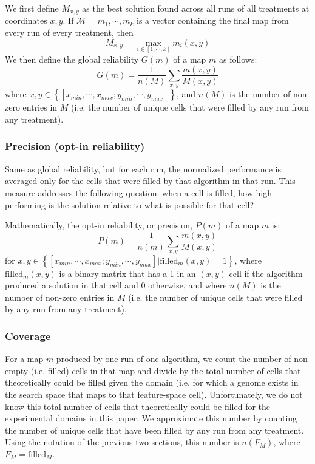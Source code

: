 \documentclass[twocolumn, DIV25, 9pt]{scrartcl}
\begin{document}
We first define $M_{x,y}$ as the best solution found across all runs of all treatments at coordinates $x, y$. If $\mathcal{M}=m_1, \cdots, m_k$ is a vector containing the final map from every run of every treatment, then
\begin{displaymath}
M_{x,y} = \max_{i \in [1, \cdots, k]} m_i(x, y)
\end{displaymath}
We then define the global reliability $G(m)$ of a map $m$ as follows:
\begin{displaymath}
G(m) = \frac{1}{n(M)} \sum_{x,y} \frac{m(x, y)}{M(x,y)}
\end{displaymath}
where $x, y \in \left\{[x_{min}, \cdots, x_{max};y_{min}, \cdots, y_{max}] \right\}$, and $n(M)$ is the number of non-zero entries in $M$ (i.e. the number of unique cells that were filled by any run from any treatment).

\subsubsection{Precision (opt-in reliability)} 
\label{methodsPrecision}

Same as global reliability, but for each run, the normalized performance is averaged only for the cells that were filled by that algorithm in that run. This measure addresses the following question: when a cell is filled, how high-performing is the solution relative to what is possible for that cell? 

Mathematically, the opt-in reliability, or precision, $P(m)$ of a map $m$ is:
\begin{displaymath}
P(m) = \frac{1}{n(m)} \sum_{x,y} \frac{m(x, y)}{M(x,y)}
\end{displaymath}
for $x, y \in \left\{[x_{min}, \cdots, x_{max};y_{min}, \cdots, y_{max}] | \textrm{filled}_{m}(x, y) = 1\right\}$, where 
$\textrm{filled}_{m}(x, y)$ 
is a binary matrix that has a 1 in an $(x,y)$ cell if the algorithm produced a solution in that cell and 0 otherwise,
and where $n(M)$ is the number of non-zero entries in $M$ (i.e. the number of unique cells that were filled by any run from any treatment).




\subsubsection{Coverage} 
\label{methodsCoverage}
For a map $m$ produced by one run of one algorithm, we count the number of non-empty (i.e. filled) cells in that map and divide by the total number of cells that theoretically could be filled given the domain (i.e. for which a genome exists in the search space that maps to that feature-space cell).  Unfortunately, we do not know this total number of cells that theoretically could be filled for the experimental domains in this paper. We approximate this number by counting the number of unique cells that have been filled by any run from any treatment. Using the notation of the previous two sections, this number is
$n(F_{M})$, 
where $F_{M} = \textrm{filled}_{M}$.
\end{document}

